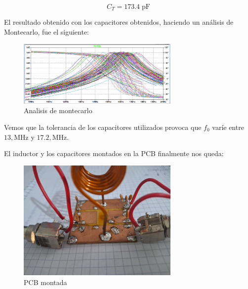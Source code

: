 \begin{equation}
    \boxed{C_T = 173.4 \; \text{pF}}
\end{equation}

El resultado obtenido con los capacitores obtenidos, haciendo un análisis de Montecarlo, fue el siguiente:

\begin{figure}[H]
    \centering
    \includegraphics[width=0.7\textwidth]{Imagenes/montecarlo.png}
    \caption{Analisis de montecarlo}
\end{figure}

Vemos que la tolerancia de los capacitores utilizados provoca que $f_0$ varíe entre $13 , \text{MHz}$ y $17.2 , \text{MHz}$.


El inductor y los capacitores montados en la PCB finalmente nos queda:

\begin{figure}[H]
    \centering
    \includegraphics[width=0.7\textwidth]{Imagenes/pcb1.jpeg}
    \caption{PCB montada}
\end{figure}

